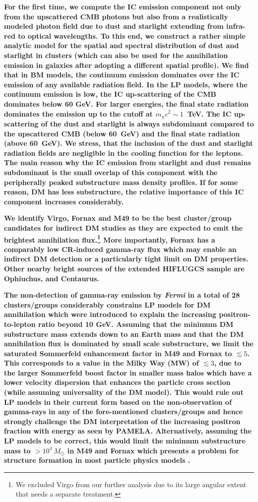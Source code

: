 \documentclass[10pt,aps,pra,reprint,amsmath,amsfonts,amssymb,showpacs,nofootinbib,floatfix]{revtex4-1}
\def\C#1{{\bf #1}}
\newcommand{\Fermi}{{\em Fermi}\xspace}
\newcommand{\msun}{M_\odot}
\begin{document}
{\C{For the first time, we compute the IC emission component not only
  from the upscattered CMB photons but also from a realistically
  modeled photon field due to dust and starlight extending from
  infra-red to optical wavelengths. To this end, we construct a rather
  simple analytic model for the spatial and spectral distribution of
  dust and starlight in clusters (which can also be used for the
  annihilation emission in galaxies after adopting a different spatial
  profile). We find that in BM models, the continuum emission
  dominates over the IC emission of any available radiation field. In
  the LP models, where the continuum emission is low, the IC
  up-scattering of the CMB dominates below 60 GeV. For larger
  energies, the final state radiation dominates the emission up to the
  cutoff at $m_\chi c^2 \sim 1$~TeV. The IC up-scattering of the dust
  and starlight is always subdominant compared to the upscattered CMB
  (below 60~GeV) and the final state radiation (above 60~GeV). We
  stress, that the inclusion of the dust and starlight radiation
  fields are negligible in the cooling function for the leptons. The
  main reason why the IC emission from starlight and dust remains
  subdominant is the small overlap of this component with the
  peripherally peaked substructure mass density profiles. If for some
  reason, DM has less substructure, the relative importance of this IC
  component increases considerably.}

\C{We identify Virgo, Fornax and M49 to be the best cluster/group
  candidates for indirect DM studies as they are expected to emit the
  brightest annihilation flux.\footnote{We excluded Virgo from our
    further analysis due to its large angular extent that needs a
    separate treatment.} More importantly, Fornax has a comparably low
  CR-induced gamma-ray flux which may enable an indirect DM detection
  or a particularly tight limit on DM properties. Other nearby bright
  sources of the extended HIFLUGCS sample are Ophiuchus, and
  Centaurus.}

\C{The non-detection of gamma-ray emission by \Fermi in a total of 28
  clusters/groups considerably constrains LP models for DM
  annihilation which were introduced to explain the increasing
  positron-to-lepton ratio beyond 10 GeV. Assuming that the minimum DM
  substructure mass extends down to an Earth mass and that the DM
  annihilation flux is dominated by small scale substructure, we limit
  the saturated Sommerfeld enhancement factor in M49 and Fornax to
  $\lesssim 5$. This corresponds to a value in the Milky Way (MW) of
  $\lesssim3$, due to the larger Sommerfeld boost factor in smaller
  mass halos which have a lower velocity dispersion that enhances the
  particle cross section (while assuming universality of the DM
  model). This would rule out LP models in their current form based on
  the non-observation of gamma-rays in any of the fore-mentioned
  clusters/groups and hence strongly challenge the DM interpretation
  of the increasing positron fraction with energy as seen by
  PAMELA. Alternatively, assuming the LP models to be correct, this
  would limit the minimum substructure mass to $>10^4~\msun$ in M49
  and Fornax which presents a problem for structure formation in most
  particle physics models \cite{2009NJPh...11j5027B}.}

}
\end{document}
